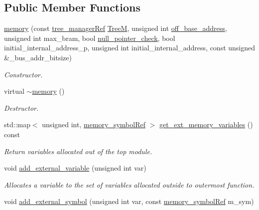 \subsection*{Public Member Functions}
\begin{DoxyCompactItemize}
\item 
\hyperlink{classmemory_a4944f160b2ac6d7b7c212beeb606bd7f}{memory} (const \hyperlink{tree__manager_8hpp_a96ff150c071ce11a9a7a1e40590f205e}{tree\+\_\+manager\+Ref} \hyperlink{classmemory_a6806f41edbd2ce52a84c3ba452d011f3}{TreeM}, unsigned int \hyperlink{classmemory_ac97a5cf7a49915e6ca63883c30c0e599}{off\+\_\+base\+\_\+address}, unsigned int max\+\_\+bram, bool \hyperlink{classmemory_af76a7dbf11a240c8f8664444295701aa}{null\+\_\+pointer\+\_\+check}, bool initial\+\_\+internal\+\_\+address\+\_\+p, unsigned int initial\+\_\+internal\+\_\+address, const unsigned \&\+\_\+bus\+\_\+addr\+\_\+bitsize)
\begin{DoxyCompactList}\small\item\em Constructor. \end{DoxyCompactList}\item 
virtual \hyperlink{classmemory_ae5893b724ce22f38b776558384f21680}{$\sim$memory} ()
\begin{DoxyCompactList}\small\item\em Destructor. \end{DoxyCompactList}\item 
std\+::map$<$ unsigned int, \hyperlink{memory__symbol_8hpp_af3608dbc27177447c2d777fa712cc82a}{memory\+\_\+symbol\+Ref} $>$ \hyperlink{classmemory_a59407bf67cc11931fc505d7fc9e86898}{get\+\_\+ext\+\_\+memory\+\_\+variables} () const
\begin{DoxyCompactList}\small\item\em Return variables allocated out of the top module. \end{DoxyCompactList}\item 
void \hyperlink{classmemory_a794e01c8ff2ed36104240903aaa4acd4}{add\+\_\+external\+\_\+variable} (unsigned int var)
\begin{DoxyCompactList}\small\item\em Allocates a variable to the set of variables allocated outside to outermost function. \end{DoxyCompactList}\item 
void \hyperlink{classmemory_afc9ff45301d4dbbb7f5a840155f74402}{add\+\_\+external\+\_\+symbol} (unsigned int var, const \hyperlink{memory__symbol_8hpp_af3608dbc27177447c2d777fa712cc82a}{memory\+\_\+symbol\+Ref} m\+\_\+sym)

\end{DoxyCompactItemize}
